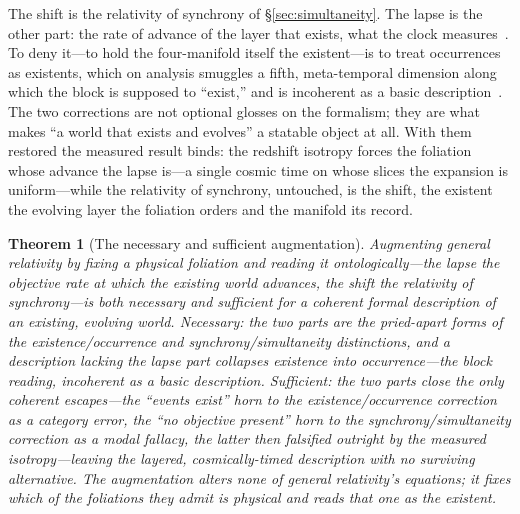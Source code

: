 \documentclass[11pt,a4paper]{article}
\newtheorem{theorem}{Theorem}
\begin{document}
The shift is the relativity of synchrony of \S\ref{sec:simultaneity}. The lapse is the other part: the rate of advance of the layer that exists, what the clock measures~\cite{JanzenTrope}. To deny it---to hold the four-manifold itself the existent---is to treat occurrences as existents, which on analysis smuggles a fifth, meta-temporal dimension along which the block is supposed to ``exist,'' and is incoherent as a basic description~\cite{JanzenTrope, JanzenCanonicalTime}. The two corrections are not optional glosses on the formalism; they are what makes ``a world that exists and evolves'' a statable object at all. With them restored the measured result binds: the redshift isotropy forces the foliation whose advance the lapse is---a single cosmic time on whose slices the expansion is uniform---while the relativity of synchrony, untouched, is the shift, the existent the evolving layer the foliation orders and the manifold its record.

\begin{theorem}[The necessary and sufficient augmentation]\label{thm:augmentation}
Augmenting general relativity by fixing a physical foliation and reading it ontologically---the lapse the objective rate at which the existing world advances, the shift the relativity of synchrony---is both necessary and sufficient for a coherent formal description of an existing, evolving world. \emph{Necessary:} the two parts are the pried-apart forms of the existence/occurrence and synchrony/simultaneity distinctions, and a description lacking the lapse part collapses existence into occurrence---the block reading, incoherent as a basic description. \emph{Sufficient:} the two parts close the only coherent escapes---the ``events exist'' horn to the existence/occurrence correction as a category error, the ``no objective present'' horn to the synchrony/simultaneity correction as a modal fallacy, the latter then falsified outright by the measured isotropy---leaving the layered, cosmically-timed description with no surviving alternative. The augmentation alters none of general relativity's equations; it fixes which of the foliations they admit is physical and reads that one as the existent.
\end{theorem}
\end{document}
